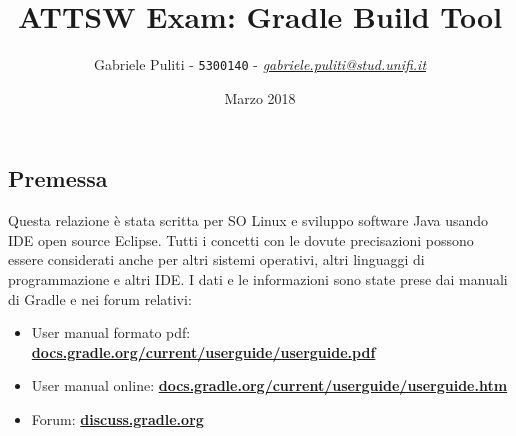 \documentclass{article}
\title{ATTSW Exam: Gradle Build Tool}
\author{Gabriele Puliti - \texttt{5300140} - \href{mailto:gabriele.puliti@stud.unifi.it}{\textit{gabriele.puliti@stud.unifi.it}}}
\date{Marzo 2018}
\begin{document}
\maketitle

\newpage
\tableofcontents
\newpage

\begin{flushleft}

\section{Premessa}
Questa relazione è stata scritta per SO Linux e sviluppo software Java usando IDE open source Eclipse. Tutti i concetti con le dovute precisazioni possono essere considerati anche per altri sistemi operativi, altri linguaggi di programmazione e altri IDE. I dati e le informazioni sono state prese dai manuali di Gradle e nei forum relativi:
\begin{itemize}
    \item User manual formato pdf: \textbf{\href{https://docs.gradle.org/current/userguide/userguide.pdf}{docs.gradle.org/current/userguide/userguide.pdf}}
    \item User manual online: \textbf{\href{https://docs.gradle.org/current/userguide/userguide.html}{docs.gradle.org/current/userguide/userguide.htm}}
    \item Forum: \textbf{\href{https://discuss.gradle.org/}{discuss.gradle.org}}
\end{itemize}


\newpage


\newpage

\newpage

\newpage


\end{flushleft}
\end{document}
